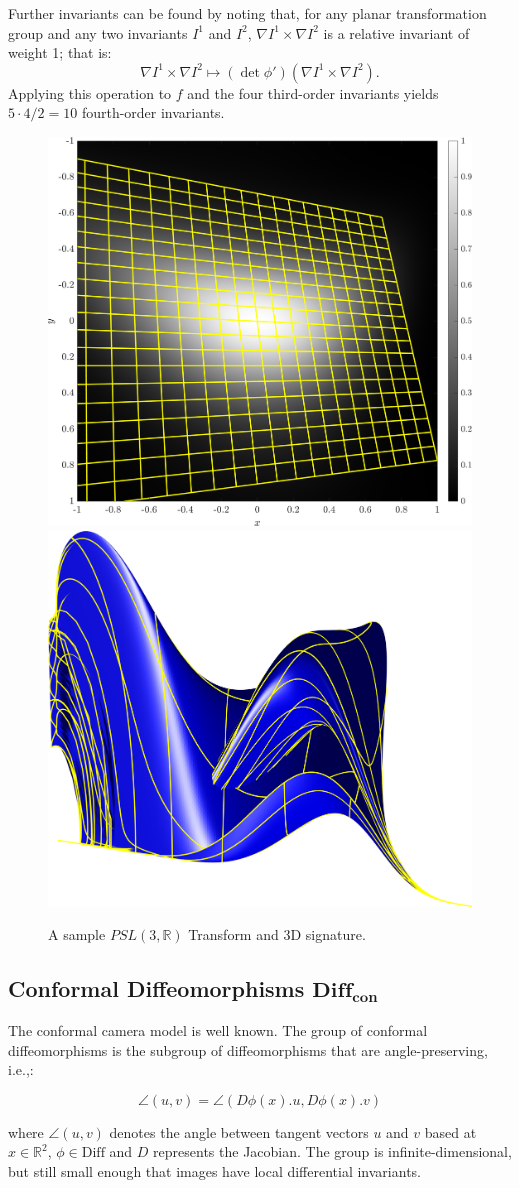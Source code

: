\documentclass[review,onefignum,onetabnum]{siamonline190516}
\begin{document}
Further invariants can be found by noting that, for any planar transformation group and any two invariants
$I^1$ and $I^2$, $\nabla I^1 \times \nabla I^2$ is a relative invariant of weight 1; that is:
$$\nabla I^1 \times \nabla I^2\mapsto (\det \phi')(\nabla I^1 \times \nabla I^2).$$
Applying this operation to $f$ and the four third-order invariants yields $5\cdot4/2=10$ fourth-order invariants.

\begin{figure}
\centering
\includegraphics[width=.45\textwidth]{Figs/f_transformed_PSL3R.png}
\includegraphics[width=.45\textwidth]{Figs/PSL3R_signature.png}
\caption{A sample $PSL(3,\mathbb{R})$ Transform and 3D signature.}
\label{fig:PSL3R}
\end{figure}

\subsection{Conformal Diffeomorphisms $\mathbf{Diff}_{\mathbf{con}}$}

The conformal camera model is well known. The group of conformal diffeomorphisms is the subgroup of diffeomorphisms that are angle-preserving, i.e.,:

\begin{equation}
\angle (u,v) = \angle (D \phi(x) . u, D \phi(x).v)
\end{equation}

\noindent where $\angle(u, v)$ denotes the angle between tangent vectors
$u$ and $v$ based at $x \in \mathbb{R}^2$, $\phi \in \textrm{Diff}$ and $D$
represents the Jacobian. The group is infinite-dimensional, but still small
enough that images have local differential invariants. 
\end{document}
